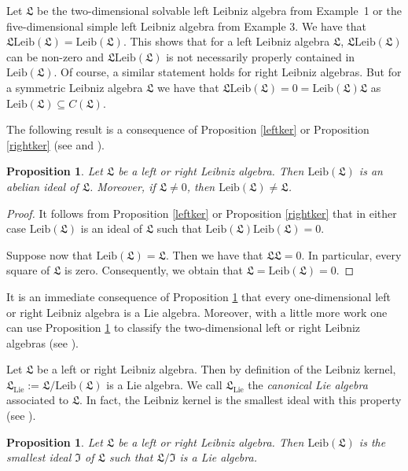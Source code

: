 \documentclass{amsart}
\newtheorem{pro}[thm]{Proposition}
\numberwithin{equation}{section}
\newcommand{\lie}{\mathrm{Lie}}
\newcommand{\leib}{\mathrm{Leib}}
\newcommand{\lf}{\mathfrak{L}}
\newcommand{\If}{\mathfrak{I}}
\begin{document}
 Let $\lf$ be the two-dimensional solvable left Leibniz algebra from
Example~1 or the five-dimensional simple left Leibniz algebra from Example 3. We have
that $\lf\leib(\lf)=\leib(\lf)$. This shows that for a left Leibniz algebra $\lf$, $\lf\leib(\lf)$
can be non-zero and $\lf\leib(\lf)$ is not necessarily properly contained in $\leib(\lf)$. Of
course, a similar statement holds for right Leibniz algebras. But for a symmetric Leibniz algebra
$\lf$ we have that $\lf\leib(\lf)=0=\leib(\lf)\lf$ as $\leib(\lf)\subseteq C(\lf)$.
\vspace{.3cm}

The following result is a consequence of Proposition \ref{leftker} or Proposition \ref{rightker}
(see \cite[p.\ 11]{DMS1} and \cite[p.\ 479]{FM}).

\begin{pro}\label{ker}
Let $\lf$ be a left or right Leibniz algebra. Then $\leib(\lf)$ is an abelian ideal of $\lf$. Moreover,
if $\lf\ne 0$, then $\leib(\lf)\ne\lf$.
\end{pro}

\begin{proof}
It follows from Proposition \ref{leftker} or Proposition \ref{rightker} that in either case $\leib(\lf)$
is an ideal of $\lf$ such that $\leib(\lf)\leib(\lf)=0$.

Suppose now that $\leib(\lf)=\lf$. Then we have that $\lf\lf=0$. In particular, every square of
$\lf$ is zero. Consequently, we obtain that $\lf=\leib(\lf)=0$.
\end{proof}
\vspace{-.05cm}

 It is an immediate consequence of Proposition \ref{ker} that every
one-dimensional left or right Leibniz algebra is a Lie algebra. Moreover, with a little more work
one can use Proposition \ref{ker} to classify the two-dimensional left or right Leibniz algebras
(see \cite[pp.\ 11/12]{DMS1}).
\vspace{.2cm}

Let $\lf$ be a left or right Leibniz algebra. Then by definition of the Leibniz kernel, $\lf_\lie:=
\lf/\leib(\lf)$ is a Lie algebra. We call $\lf_\lie$ the {\em canonical Lie algebra\/} associated to
$\lf$. In fact, the Leibniz kernel is the smallest ideal with this property (see \cite[Theorem~2.5]{FM}).

\begin{pro}\label{minlie}
Let $\lf$ be a left or right Leibniz algebra. Then $\leib(\lf)$ is the smallest ideal $\If$ of $\lf$ such
that $\lf/\If$ is a Lie algebra.
\end{pro}
\end{document}
